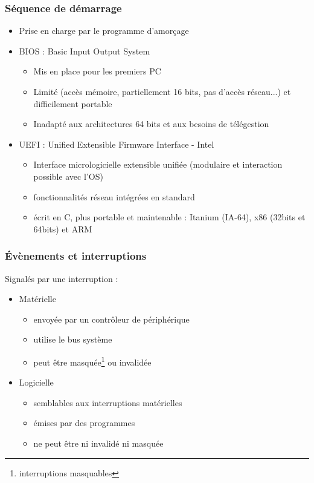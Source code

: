 \begin{frame}
\frametitle{Séquence de démarrage}
\begin{itemize}
\item Prise en charge par le programme d'amorçage
\item BIOS : Basic Input Output System \cite{wp-bios}
\begin{itemize}
\item Mis en place pour les premiers PC
\item Limité (accès mémoire, partiellement 16 bits, pas d'accès réseau...) et difficilement portable
\item Inadapté aux architectures 64 bits et aux besoins de télégestion
\end{itemize}

\item UEFI : Unified Extensible Firmware Interface \cite{wp-uefi} - Intel
\begin{itemize}
\item Interface micrologicielle extensible unifiée (modulaire et interaction possible avec l'OS)
\item fonctionnalités réseau intégrées en standard
\item écrit en C, plus portable et maintenable :  Itanium (IA-64), x86 (32bits et 64bits) et ARM
\end{itemize}
\end{itemize}
\end{frame}



\begin{frame}
\frametitle{Évènements et interruptions}
Signalés par une interruption :
\begin{itemize}
\item Matérielle
\begin{itemize}
\item envoyée par un contrôleur de périphérique
\item utilise le bus système
\item peut être masquée\footnote{interruptions masquables} ou invalidée 
\end{itemize}
\item Logicielle
\begin{itemize}
\item semblables aux interruptions matérielles
\item émises par des programmes
\item ne peut être ni invalidé ni masquée
\end{itemize}
\end{itemize}
\end{frame}



